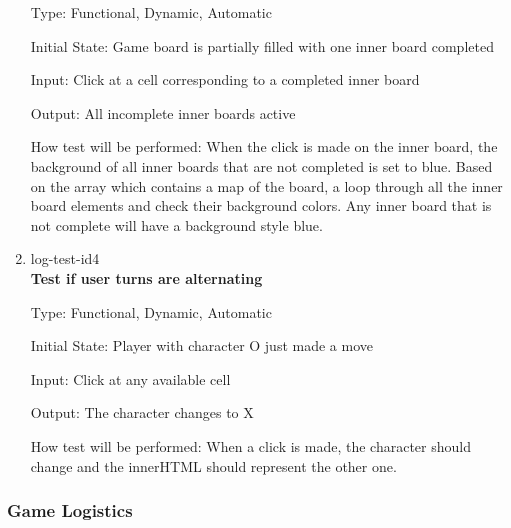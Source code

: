 \documentclass[12pt, titlepage]{article}
\begin{document}
\begin{enumerate}
Type: Functional, Dynamic, Automatic
					
Initial State: Game board is partially filled with one inner board completed

Input: Click at a cell corresponding to a completed inner board
					
Output: All incomplete inner boards active
					
How test will be performed: When the click is made on the inner board, the
background of all inner boards that are not completed is set to blue. Based on
the array which contains a map of the board, a loop through all the inner
board elements and check their background colors. Any inner board that is not
complete will have a background style blue.

\item{log-test-id4\\}
\textbf{Test if user turns are alternating}

Type: Functional, Dynamic, Automatic
					
Initial State: Player with character O just made a move

Input: Click at any available cell
					
Output: The character changes to X
					
How test will be performed: When a click is made, the character should change
and the innerHTML should represent the other one.

\end{enumerate}

\subsubsection{Game Logistics}
\end{document}
